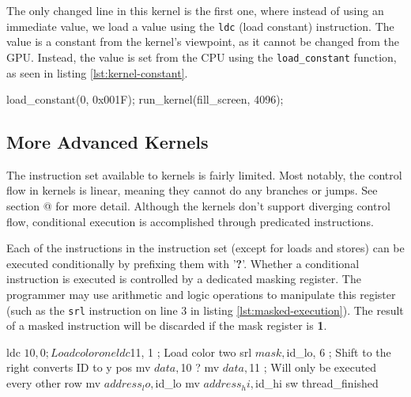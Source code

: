 \documentclass[../main/report.tex]{subfiles}
\begin{document}

The only changed line in this kernel is the first one,
where instead of using an immediate value, we load a value using the \verb/ldc/ (load constant) instruction.
The value is a constant from the kernel's viewpoint, as it cannot be changed from the GPU.
Instead, the value is set from the CPU using the \verb/load_constant/ function,
as seen in listing \ref{lst:kernel-constant}.

\begin{c-code}[caption=Now drawing a blue screen using parameters, label=lst:kernel-constant]
load_constant(0, 0x001F);
run_kernel(fill_screen, 4096);
\end{c-code}

\subsection{More Advanced Kernels}
The instruction set available to kernels is fairly limited.
Most notably, the control flow in kernels is linear, meaning they cannot do any branches or jumps. See section @ for more detail. 
Although the kernels don't support diverging control flow,
conditional execution is accomplished through predicated instructions.

Each of the instructions in the instruction set (except for loads and stores) can be executed conditionally by prefixing them with '\textbf{?}'.
Whether a conditional instruction is executed is controlled by a dedicated masking register.
The programmer may use arithmetic and logic operations to manipulate this register (such as the \verb/srl/ instruction on line 3 in listing \ref{lst:masked-execution}).
The result of a masked instruction will be discarded if the mask register is \textbf{1}.

\begin{assembly}[caption=Conditional execution using predicated instructions, label=lst:masked-execution]
ldc $10, 0 ; Load color one
ldc $11, 1 ; Load color two
srl $mask, $id_lo, 6 ; Shift to the right converts ID to y pos
mv $data, $10 
? mv $data, $11 ; Will only be executed every other row
mv $address_lo, $id_lo
mv $address_hi, $id_hi
sw
thread_finished
\end{assembly}
\end{document}
